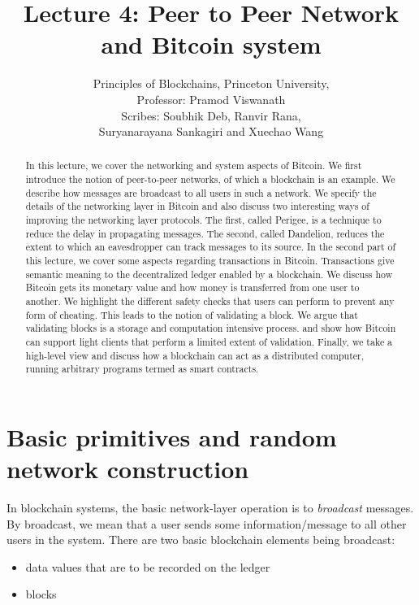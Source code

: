 \documentclass{article}
\title{Lecture 4:  Peer to Peer Network and Bitcoin system}
\author{Principles of Blockchains, Princeton University,  \\ Professor:  Pramod Viswanath \\ Scribes: Soubhik Deb, Ranvir Rana, \\Suryanarayana Sankagiri and Xuechao Wang}
\begin{document}
\maketitle

\begin{abstract}
In this lecture, we cover the networking and system aspects of Bitcoin. We first introduce the notion of peer-to-peer networks, of which a blockchain is an example. We describe how messages are broadcast to all users in such a network. We specify the details of the networking layer in Bitcoin and also discuss two interesting ways of improving the networking layer protocols. The first, called \textsf{Perigee}, is a technique to reduce the delay in propagating messages. The second, called \textsf{Dandelion}, reduces the extent to which an eavesdropper can track messages to its source. In the second part of this lecture, we cover some aspects regarding transactions in Bitcoin. Transactions give semantic meaning to the decentralized ledger enabled by a blockchain. We discuss how Bitcoin gets its monetary value and how money is transferred from one user to another. We highlight the different safety checks that users can perform to prevent any form of cheating. This leads to the notion of validating a block. We argue that validating blocks is a storage and computation intensive process. and show how Bitcoin can support light clients that perform a limited extent of validation. Finally, we take a high-level view and discuss how a blockchain can act as a distributed computer, running arbitrary programs termed as smart contracts.
\end{abstract}

\section*{Basic primitives and random network construction}
In blockchain systems, the basic network-layer operation is to {\em broadcast} messages. By broadcast, we mean that a user sends some information/message to all other users in the system. There are two basic blockchain elements being broadcast:
\begin{itemize}
    \item data values that are to be recorded on the ledger
    \item blocks
\end{itemize}
\end{document}
